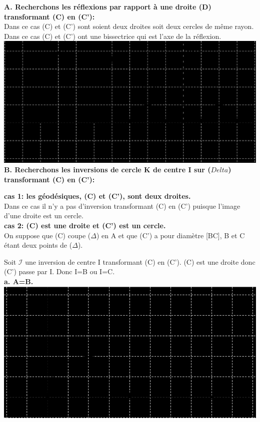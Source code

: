 \documentclass[a4paper, 12pt, twoside]{book}
\begin{document}
 

\textbf{A. Recherchons les réflexions par rapport à une droite (D) transformant (C) en (C'):}\\


Dans ce cas (C) et (C') sont soient deux droites soit deux cercles de même rayon. Dans ce cas (C) et (C') ont une bissectrice qui est l'axe de la réflexion.\\

\includegraphics[scale=0.5]{figures/bis1.eps} \\



\textbf{B. Recherchons les inversions de cercle K de centre I sur ($Delta$) transformant (C) en (C'): }


\textbf{cas 1: les géodésiques, (C) et (C'), sont deux droites.}\\

Dans ce cas il n'y a pas d'inversion transformant (C) en (C') puisque l'image d'une droite est un cercle.\\

\textbf{cas 2: (C) est une droite et (C') est un cercle.}\\

On suppose que (C) coupe ($\Delta$) en A et que (C') a pour diamètre [BC], B et C étant deux points de ($\Delta$).\

Soit $\mathcal{I}$ une inversion de centre I transformant (C) en (C'). (C) est une droite donc (C') passe par I. Donc I=B ou I=C.\\

\newpage \textbf{a. A=B.} \\

\includegraphics[scale=0.9]{figures/hyper38.eps}\\
\end{document}

